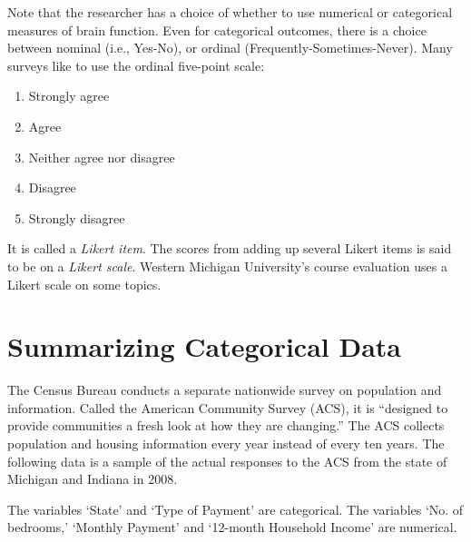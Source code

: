 \documentclass[11pt]{book}\usepackage[]{graphicx}\usepackage[]{color}
\begin{document}
Note that the researcher has a choice of whether to use numerical or categorical measures of brain function.  Even for categorical outcomes, there is a choice between nominal (i.e., Yes-No), or ordinal (Frequently-Sometimes-Never). Many surveys like to use the ordinal five-point scale:

{\small{
\begin{enumerate}
\item Strongly agree
\item Agree
\item Neither agree nor disagree
\item Disagree
\item Strongly disagree
\end{enumerate}
}}

It is called a \textit{Likert item}.  The scores from adding up several Likert items is said to be on a \textit{Likert scale}.  Western Michigan University's course evaluation uses a Likert scale on some topics.

\section{Summarizing Categorical Data}

The Census Bureau conducts a separate nationwide survey on population and information.  Called the American Community Survey (ACS), it is ``designed to provide communities a fresh look at how they are changing.'' The ACS collects population and housing information every year instead of every ten years.  The following data is a sample of the actual responses to the ACS from the state of Michigan and Indiana in 2008.

The variables `State' and `Type of Payment' are categorical.  The variables `No. of bedrooms,' `Monthly Payment' and `12-month Household Income' are numerical.
\end{document}
